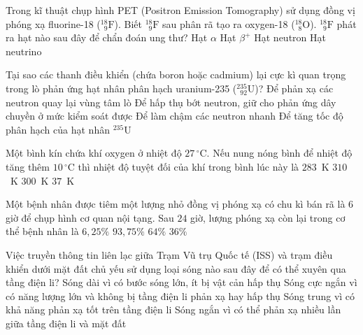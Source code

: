 	\begin{ex}%
		Trong kĩ thuật chụp hình PET (Positron Emission Tomography) sử dụng đồng vị phóng xạ fluorine-18 (${}^{18}_{\phantom{1}9}\text{F}$). Biết ${}^{18}_{\phantom{1}9}\text{F}$ sau phân rã tạo ra oxygen-18 (${}^{18}_{\phantom{1}8}\text{O}$). ${}^{18}_{\phantom{1}9}\text{F}$ phát ra hạt nào sau đây để chẩn đoán ung thư?
		\choice
		{Hạt $\alpha$}
		{\True Hạt $\beta^{+}$}
		{Hạt neutron}
		{Hạt neutrino}
	\end{ex}

	\begin{ex}%
		Tại sao các thanh điều khiển (chứa boron hoặc cadmium) lại cực kì quan trọng trong lò phản ứng hạt nhân phân hạch uranium-235 (${}^{235}_{\phantom{2}92}\text{U}$)?
		\choice
		{Để phản xạ các neutron quay lại vùng tâm lò}
		{\True Để hấp thụ bớt neutron, giữ cho phản ứng dây chuyền ở mức kiểm soát được}
		{Để làm chậm các neutron nhanh}
		{Để tăng tốc độ phân hạch của hạt nhân ${}^{235}\text{U}$}
	\end{ex}

	\begin{ex}%
		Một bình kín chứa khí oxygen ở nhiệt độ $27\,^\circ\text{C}$. Nếu nung nóng bình để nhiệt độ tăng thêm $10\,^\circ\text{C}$ thì nhiệt độ tuyệt đối của khí trong bình lúc này là
		\choice
		{$283$~K}
		{\True $310$~K}
		{$300$~K}
		{$37$~K}
	\end{ex}

	\begin{ex}%
		Một bệnh nhân được tiêm một lượng nhỏ đồng vị phóng xạ có chu kì bán rã là $6$ giờ để chụp hình cơ quan nội tạng. Sau $24$ giờ, lượng phóng xạ còn lại trong cơ thể bệnh nhân là
		\choice
		{\True $6{,}25\%$}
		{$93{,}75\%$}
		{$64\%$}
		{$36\%$}
	\end{ex}

	\begin{ex}%
		Việc truyền thông tin liên lạc giữa Trạm Vũ trụ Quốc tế (ISS) và trạm điều khiển dưới mặt đất chủ yếu sử dụng loại sóng nào sau đây để có thể xuyên qua tầng điện li?
		\choice
		{Sóng dài vì có bước sóng lớn, ít bị vật cản hấp thụ}
		{\True Sóng cực ngắn vì có năng lượng lớn và không bị tầng điện li phản xạ hay hấp thụ}
		{Sóng trung vì có khả năng phản xạ tốt trên tầng điện li}
		{Sóng ngắn vì có thể phản xạ nhiều lần giữa tầng điện li và mặt đất}
	\end{ex}

